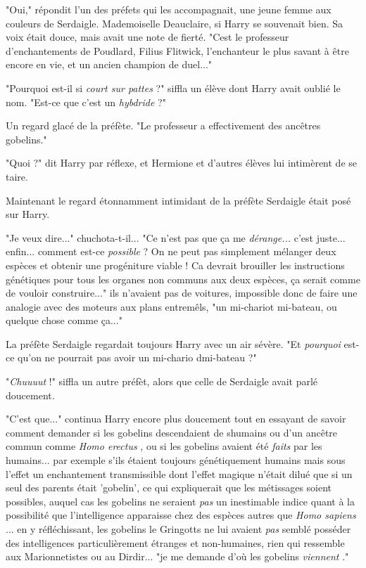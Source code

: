 "Oui," répondit l'un des préfets qui les accompagnait, une jeune femme aux couleurs de Serdaigle. Mademoiselle Deauclaire, si Harry se souvenait bien. Sa voix était douce, mais avait une note de fierté. "Cest le professeur d'enchantements de Poudlard, Filius Flitwick, l'enchanteur le plus savant à être encore en vie, et un ancien champion de duel..."

"Pourquoi est-il si \emph{court sur pattes}  ?" siffla un élève dont Harry avait oublié le nom. "Est-ce que c'est un \emph{hybdride}  ?"

Un regard glacé de la préfète. "Le professeur a effectivement des ancêtres gobelins."

"Quoi ?" dit Harry par réflexe, et Hermione et d'autres élèves lui intimèrent de se taire.

Maintenant le regard étonnamment intimidant de la préfète Serdaigle était posé sur Harry.

"Je veux dire..." chuchota-t-il... "Ce n'est pas que ça me \emph{dérange...}  c'est juste... enfin... comment est-ce \emph{possible } ? On ne peut pas simplement mélanger deux espèces et obtenir une progéniture viable ! Ca devrait brouiller les instructions génétiques pour tous les organes non communs aux deux espèces, ça serait comme de vouloir construire..." ils n'avaient pas de voitures, impossible donc de faire une analogie avec des moteurs aux plans entremêls, "un mi-chariot mi-bateau, ou quelque chose comme ça..."

La préfète Serdaigle regardait toujours Harry avec un air sévère. "Et \emph{pourquoi}  est-ce qu'on ne pourrait pas avoir un mi-chario dmi-bateau ?"

"\emph{Chuuuut}  !" siffla un autre préfèt, alors que celle de Serdaigle avait parlé doucement.

"C'est que..." continua Harry encore plus doucement tout en essayant de savoir comment demander si les gobelins descendaient de shumains ou d'un ancêtre commun comme \emph{Homo erectus} , ou si les gobelins avaient été \emph{faits}  par les humains... par exemple s'ils étaient toujours génétiquement humains mais sous l'effet un enchantement transmissible dont l'effet magique n'était dilué que si un seul des parents était 'gobelin', ce qui expliquerait que les métissages soient possibles, auquel cas les gobelins ne seraient \emph{pas}  un inestimable indice quant à la possibilité que l'intelligence apparaisse chez des espèces autres que \emph{Homo sapiens} ... en y réfléchissant, les gobelins le Gringotts ne lui avaient \emph{pas}  semblé posséder des intelligences particulièrement étranges et non-humaines, rien qui ressemble aux Marionnetistes ou au Dirdir... "je me demande d'où les gobelins \emph{viennent} ."

